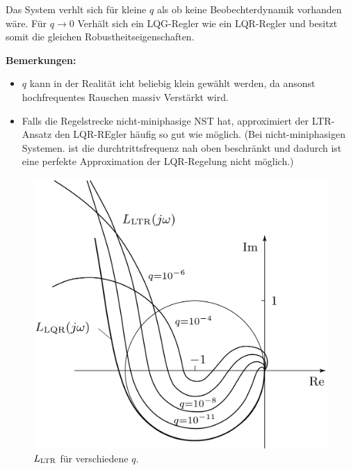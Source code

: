         Das System verhlt sich für kleine $q$ als ob keine Beobechterdynamik vorhanden wäre. Für $q\to 0$ Verhält sich ein LQG-Regler wie ein LQR-Regler und besitzt somit die gleichen Robustheitseigenschaften.
        
        \textbf{Bemerkungen:}
        \begin{itemize}
            \item $q$ kann in der Realität icht beliebig klein gewählt werden, da ansonst hochfrequentes Rauschen massiv Verstärkt wird.
            
            \item Falls die Regelstrecke nicht-miniphasige NST hat, approximiert der LTR-Ansatz den LQR-REgler häufig so gut wie möglich. (Bei nicht-miniphasigen Systemen. ist die durchtrittsfrequenz nah oben beschränkt und dadurch ist eine perfekte Approximation der LQR-Regelung nicht möglich.)
        \end{itemize}
        
        \begin{figure}[H]
            \centering
            \includegraphics[width = 0.6\linewidth]{images/11/L_LTR.jpeg}
            \caption{$L_{\textnormal{LTR}}$ für verschiedene $q$.}
        \end{figure}
        